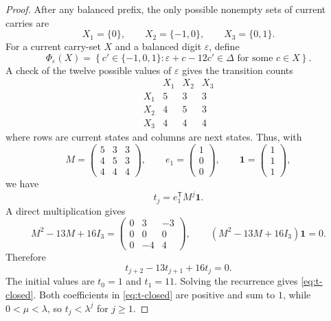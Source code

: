 \documentclass[10pt,a4paper]{amsart}
\newcommand{\one}{\mathbf 1}
\begin{document}
\begin{proof}
After any balanced prefix, the only possible nonempty sets of current carries
are
\[
 X_1=\{0\},
 \qquad
 X_2=\{-1,0\},
 \qquad
 X_3=\{0,1\}.
\]
For a current carry-set $X$ and a balanced digit $\varepsilon$, define
\[
 \Phi_\varepsilon(X)=
 \left\{
 c'\in\{-1,0,1\}:
 \varepsilon+c-12c'\in\Delta
 \text{ for some }c\in X
 \right\}.
\]
A check of the twelve possible values of $\varepsilon$ gives the transition
counts
\begin{equation}\label{eq:transition-table}
\begin{array}{c|ccc}
 &X_1&X_2&X_3\\ \hline
 X_1&5&3&3\\
 X_2&4&5&3\\
 X_3&4&4&4
\end{array}
\end{equation}
where rows are current states and columns are next states.  Thus, with
\[
 M=
 \begin{pmatrix}
 5&3&3\\
 4&5&3\\
 4&4&4
 \end{pmatrix},
 \qquad
 e_1=\begin{pmatrix}1\\0\\0\end{pmatrix},
 \qquad
 \one=\begin{pmatrix}1\\1\\1\end{pmatrix},
\]
we have
\[
 t_j=e_1^{\mathsf T}M^j\one.
\]
A direct multiplication gives
\[
 M^2-13M+16I_3
 =
 \begin{pmatrix}
 0&3&-3\\
 0&0&0\\
 0&-4&4
 \end{pmatrix},
 \qquad
 (M^2-13M+16I_3)\one=0.
\]
Therefore
\[
 t_{j+2}-13t_{j+1}+16t_j=0.
\]
The initial values are $t_0=1$ and $t_1=11$.  Solving the recurrence gives
\eqref{eq:t-closed}.  Both coefficients in \eqref{eq:t-closed} are positive
and sum to $1$, while $0<\mu<\lambda$, so $t_j<\lambda^j$ for $j\ge1$.
\end{proof}
\end{document}
